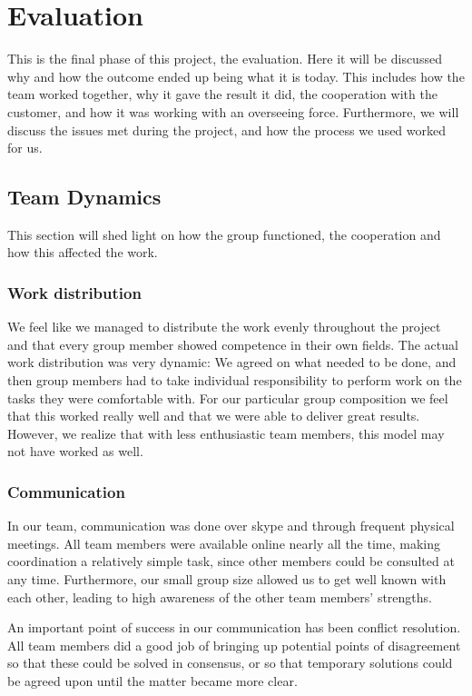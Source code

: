 \chapter{Evaluation}

\minitoc
This is the final phase of this project, the evaluation. Here it will be discussed why and how the outcome ended up being what it is today. This includes how the team worked together, why it gave the result it did, the cooperation with the customer, and how it was working with an overseeing force. Furthermore, we will discuss the issues met during the project, and how the process we used worked for us.

\clearpage

\section{Team Dynamics}
This section will shed light on how the group functioned, the cooperation and how this affected the work.

\subsection*{Work distribution}
We feel like we managed to distribute the work evenly throughout the project and that every group member showed competence in their own fields. The actual work distribution was very dynamic: We agreed on what needed to be done, and then group members had to take individual responsibility to perform work on the tasks they were comfortable with. For our particular group composition we feel that this worked really well and that we were able to deliver great results. However, we realize that with less enthusiastic team members, this model may not have worked as well.

\subsection*{Communication}
In our team, communication was done over skype and through frequent physical meetings. All team members were available online nearly all the time, making coordination a relatively simple task, since other members could be consulted at any time. Furthermore, our small group size allowed us to get well known with each other, leading to high awareness of the other team members’ strengths.

An important point of success in our communication has been conflict resolution. All team members did a good job of bringing up potential points of disagreement so that these could be solved in consensus, or so that temporary solutions could be agreed upon until the matter became more clear.

